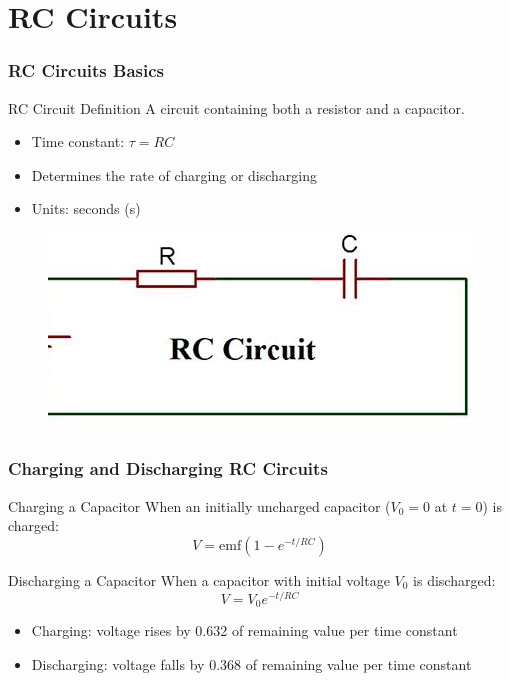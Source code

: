 \documentclass{beamer}
\begin{document}
\section{RC Circuits}
\begin{frame}
    \frametitle{RC Circuits Basics}
    \begin{block}{RC Circuit Definition}
        A circuit containing both a resistor and a capacitor.
    \end{block}
    \begin{itemize}
        \item Time constant: $\tau = RC$
        \item Determines the rate of charging or discharging
        \item Units: seconds (s)
    \end{itemize}
   
        \begin{figure}
            \centering
            \includegraphics[width=0.65\linewidth]{phys12-circuits-kirchhoffs-junction-rule.jpg}
        \end{figure}
  
\end{frame}

\begin{frame}
    \frametitle{Charging and Discharging RC Circuits}
    \begin{block}{Charging a Capacitor}
        When an initially uncharged capacitor ($V_0 = 0$ at $t = 0$) is charged:
        \[ V = \text{emf}(1-e^{-t/RC}) \]
    \end{block}
    \begin{block}{Discharging a Capacitor}
        When a capacitor with initial voltage $V_0$ is discharged:
        \[ V = V_0e^{-t/RC} \]
    \end{block}
    \begin{itemize}
        \item Charging: voltage rises by 0.632 of remaining value per time constant
        \item Discharging: voltage falls by 0.368 of remaining value per time constant
    \end{itemize}
\end{frame}
\end{document}
